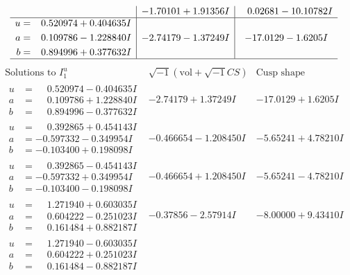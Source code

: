 \documentclass[1p]{elsarticle_modified}
\theoremstyle{definition}
\newcommand{\I}{\sqrt{-1}}
\begin{document}
$$\begin{array}{c|c|c}
 & -1.70101 + 1.91356 I & \phantom{-}0.02681 - 10.10782 I \\ \hline\begin{aligned}
u &= \phantom{-}0.520974 + 0.404635 I \\
a &= \phantom{-}0.109786 - 1.228840 I \\
b &= \phantom{-}0.894996 + 0.377632 I\end{aligned}
 & -2.74179 - 1.37249 I & -17.0129 - 1.6205 I\\
 \hline 
 \end{array}$$\newpage$$\begin{array}{c|c|c}  
\text{Solutions to }I^u_{1}& \I (\text{vol} + \sqrt{-1}CS) & \text{Cusp shape}\\
 \hline 
\begin{aligned}
u &= \phantom{-}0.520974 - 0.404635 I \\
a &= \phantom{-}0.109786 + 1.228840 I \\
b &= \phantom{-}0.894996 - 0.377632 I\end{aligned}
 & -2.74179 + 1.37249 I & -17.0129 + 1.6205 I \\ \hline\begin{aligned}
u &= \phantom{-}0.392865 + 0.454143 I \\
a &= -0.597332 - 0.349954 I \\
b &= -0.103400 + 0.198098 I\end{aligned}
 & -0.466654 - 1.208450 I & -5.65241 + 4.78210 I \\ \hline\begin{aligned}
u &= \phantom{-}0.392865 - 0.454143 I \\
a &= -0.597332 + 0.349954 I \\
b &= -0.103400 - 0.198098 I\end{aligned}
 & -0.466654 + 1.208450 I & -5.65241 - 4.78210 I \\ \hline\begin{aligned}
u &= \phantom{-}1.271940 + 0.603035 I \\
a &= \phantom{-}0.604222 - 0.251023 I \\
b &= \phantom{-}0.161484 + 0.882187 I\end{aligned}
 & -0.37856 - 2.57914 I & -8.00000 + 9.43410 I \\ \hline\begin{aligned}
u &= \phantom{-}1.271940 - 0.603035 I \\
a &= \phantom{-}0.604222 + 0.251023 I \\
b &= \phantom{-}0.161484 - 0.882187 I\end{aligned}

\end{array}$$
\end{document}
